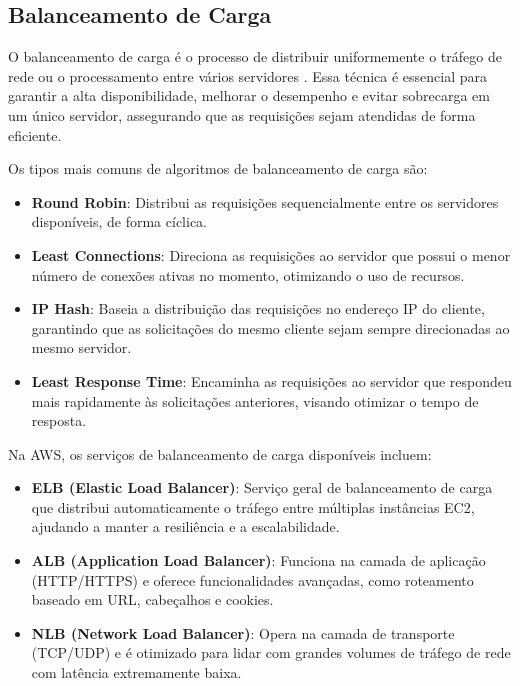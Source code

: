 \subsection{Balanceamento de Carga}


O balanceamento de carga é o processo de distribuir uniformemente o tráfego de rede ou o processamento entre vários servidores \cite{what-is-load-balancing}. Essa técnica é essencial para garantir a alta disponibilidade, melhorar o desempenho e evitar sobrecarga em um único servidor, assegurando que as requisições sejam atendidas de forma eficiente.

Os tipos mais comuns de algoritmos de balanceamento de carga são:

\begin{itemize}
    \item \textbf{Round Robin}: Distribui as requisições sequencialmente entre os servidores disponíveis, de forma cíclica.
    \item \textbf{Least Connections}: Direciona as requisições ao servidor que possui o menor número de conexões ativas no momento, otimizando o uso de recursos.
    \item \textbf{IP Hash}: Baseia a distribuição das requisições no endereço IP do cliente, garantindo que as solicitações do mesmo cliente sejam sempre direcionadas ao mesmo servidor.
    \item \textbf{Least Response Time}: Encaminha as requisições ao servidor que respondeu mais rapidamente às solicitações anteriores, visando otimizar o tempo de resposta.
\end{itemize}

Na AWS, os serviços de balanceamento de carga disponíveis incluem:

\begin{itemize}
    \item \textbf{ELB (Elastic Load Balancer)}: Serviço geral de balanceamento de carga que distribui automaticamente o tráfego entre múltiplas instâncias EC2, ajudando a manter a resiliência e a escalabilidade.
    \item \textbf{ALB (Application Load Balancer)}: Funciona na camada de aplicação (HTTP/HTTPS) e oferece funcionalidades avançadas, como roteamento baseado em URL, cabeçalhos e cookies.
    \item \textbf{NLB (Network Load Balancer)}: Opera na camada de transporte (TCP/UDP) e é otimizado para lidar com grandes volumes de tráfego de rede com latência extremamente baixa.
\end{itemize}



